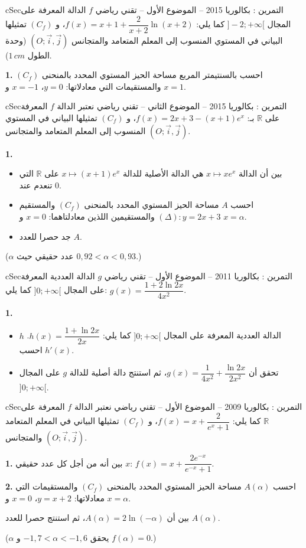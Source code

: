 \documentclass[12pt,a4paper]{article}
\newenvironment{BOX}[2]{\begin{otherlanguage}{english}\begin{arbox}{#1}{#2}}{\end{arbox}\end{otherlanguage}}
\newcounter{exo}
\newenvironment{tamrin}[1]{\stepcounter{exo}\begin{BOX}{cSec}{التمرين \theexo: #1}}{\end{BOX}}
\newcommand{\R}{\mathbb{R}}
\newenvironment{sq}{\begin{itemize}[leftmargin=2.4em,itemsep=3pt]}{\end{itemize}}
\newcommand{\qa}{\item[(أ)]}\newcommand{\qb}{\item[(ب)]}\newcommand{\qc}{\item[(جـ)]}\newcommand{\qd}{\item[(د)]}\newcommand{\qe}{\item[(هـ)]}
\newcommand{\QQ}[1]{\par\smallskip\textbf{#1.} }
\begin{document}
\begin{tamrin}{بكالوريا 2015 -- الموضوع الأول -- تقني رياضي}
$f$ الدالة المعرفة على المجال $]-2;+\infty[$ كما يلي: $f(x)=x+1+\dfrac{2}{x+2}\ln(x+2)$، و $(C_f)$ تمثيلها البياني في المستوي المنسوب إلى المعلم المتعامد والمتجانس $(O;\vec{i},\vec{j})$ (وحدة الطول $1\,cm$).

\QQ{1} احسب بالسنتيمتر المربع مساحة الحيز المستوي المحدد بالمنحنى $(C_f)$ والمستقيمات التي معادلاتها: $y=0$، $x=-1$ و $x=1$.
\end{tamrin}

\begin{tamrin}{بكالوريا 2015 -- الموضوع الثاني -- تقني رياضي}
نعتبر الدالة $f$ المعرفة على $\R$ بـ: $f(x)=2x+3-(x+1)e^{x}$، و $(C_f)$ تمثيلها البياني في المستوي المنسوب إلى المعلم المتعامد والمتجانس $(O;\vec{i},\vec{j})$.

\QQ{1}
\begin{sq}
\qa بين أن الدالة $x\mapsto xe^{x}$ هي الدالة الأصلية للدالة $x\mapsto(x+1)e^{x}$ على $\R$ التي تنعدم عند $0$.
\qb احسب $A$ مساحة الحيز المستوي المحدد بالمنحنى $(C_f)$ والمستقيم $(\Delta):y=2x+3$ والمستقيمين اللذين معادلتاهما: $x=0$ و $x=\alpha$.
\qc جد حصرا للعدد $A$.
\end{sq}
($\alpha$ عدد حقيقي حيث $0{,}92<\alpha<0{,}93$.)
\end{tamrin}

\begin{tamrin}{بكالوريا 2011 -- الموضوع الأول -- تقني رياضي}
$g$ الدالة العددية المعرفة على المجال $]0;+\infty[$ كما يلي: $g(x)=\dfrac{1+2\ln2x}{4x^{2}}$.

\QQ{1}
\begin{sq}
\qa $h$ الدالة العددية المعرفة على المجال $]0;+\infty[$ كما يلي: $h(x)=\dfrac{1+\ln2x}{2x}$. احسب $h'(x)$.
\qb تحقق أن $g(x)=\dfrac{1}{4x^{2}}+\dfrac{\ln2x}{2x^{2}}$، ثم استنتج دالة أصلية للدالة $g$ على المجال $]0;+\infty[$.
\end{sq}
\end{tamrin}

\begin{tamrin}{بكالوريا 2009 -- الموضوع الأول -- تقني رياضي}
نعتبر الدالة $f$ المعرفة على $\R$ كما يلي: $f(x)=x+\dfrac{2}{e^{x}+1}$، و $(C_f)$ تمثيلها البياني في المعلم المتعامد والمتجانس $(O;\vec{i},\vec{j})$.

\QQ{1} بين أنه من أجل كل عدد حقيقي $x$: $f(x)=x+\dfrac{2e^{-x}}{e^{-x}+1}$.

\QQ{2} احسب $A(\alpha)$ مساحة الحيز المستوي المحدد بالمنحنى $(C_f)$ والمستقيمات التي معادلاتها: $y=x+2$، $x=0$ و $x=\alpha$.

بين أن $A(\alpha)=2\ln(-\alpha)$، ثم استنتج حصرا للعدد $A(\alpha)$.

($\alpha$ يحقق $-1{,}7<\alpha<-1{,}6$ و $f(\alpha)=0$.)
\end{tamrin}
\end{document}

